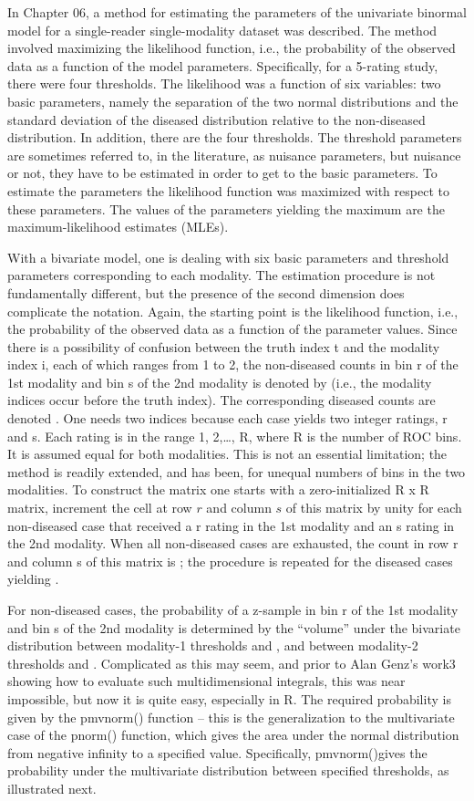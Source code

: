 \documentclass[
]{book}
\begin{document}
In Chapter 06, a method for estimating the parameters of the univariate binormal model for a single-reader single-modality dataset was described. The method involved maximizing the likelihood function, i.e., the probability of the observed data as a function of the model parameters. Specifically, for a 5-rating study, there were four thresholds. The likelihood was a function of six variables: two basic parameters, namely the separation of the two normal distributions and the standard deviation of the diseased distribution relative to the non-diseased distribution. In addition, there are the four thresholds. The threshold parameters are sometimes referred to, in the literature, as nuisance parameters, but nuisance or not, they have to be estimated in order to get to the basic parameters. To estimate the parameters the likelihood function was maximized with respect to these parameters. The values of the parameters yielding the maximum are the maximum-likelihood estimates (MLEs).

With a bivariate model, one is dealing with six basic parameters and threshold parameters corresponding to each modality. The estimation procedure is not fundamentally different, but the presence of the second dimension does complicate the notation. Again, the starting point is the likelihood function, i.e., the probability of the observed data as a function of the parameter values. Since there is a possibility of confusion between the truth index t and the modality index i, each of which ranges from 1 to 2, the non-diseased counts in bin r of the 1st modality and bin s of the 2nd modality is denoted by (i.e., the modality indices occur before the truth index). The corresponding diseased counts are denoted . One needs two indices because each case yields two integer ratings, r and s. Each rating is in the range 1, 2,\ldots, R, where R is the number of ROC bins. It is assumed equal for both modalities. This is not an essential limitation; the method is readily extended, and has been, for unequal numbers of bins in the two modalities. To construct the matrix one starts with a zero-initialized R x R matrix, increment the cell at row \(r\) and column \(s\) of this matrix by unity for each non-diseased case that received a r rating in the 1st modality and an s rating in the 2nd modality. When all non-diseased cases are exhausted, the count in row r and column s of this matrix is ; the procedure is repeated for the diseased cases yielding .

For non-diseased cases, the probability of a z-sample in bin r of the 1st modality and bin s of the 2nd modality is determined by the ``volume'' under the bivariate distribution between modality-1 thresholds and , and between modality-2 thresholds and . Complicated as this may seem, and prior to Alan Genz's work3 showing how to evaluate such multidimensional integrals, this was near impossible, but now it is quite easy, especially in R. The required probability is given by the pmvnorm() function -- this is the generalization to the multivariate case of the pnorm() function, which gives the area under the normal distribution from negative infinity to a specified value. Specifically, pmvnorm()gives the probability under the multivariate distribution between specified thresholds, as illustrated next.
\end{document}
